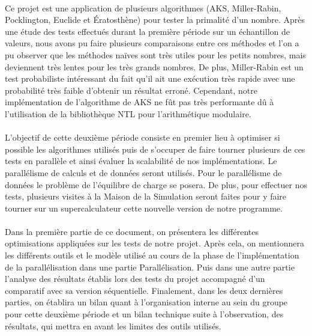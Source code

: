 	\paragraph{}Ce projet est une application de plusieurs algorithmes (AKS, Miller-Rabin, Pocklington, Euclide et Ératosthène) pour tester la primalité d'un nombre. Après une étude des tests effectués durant la première période sur un échantillon de valeurs, nous avons pu faire plusieurs comparaisons entre ces méthodes et l'on a pu observer que les méthodes naïves sont très utiles pour les petits nombres, mais deviennent très lentes pour les très grands nombres. De plus, Miller-Rabin est un test probabiliste intéressant du fait qu'il ait une exécution très rapide avec une probabilité très faible d'obtenir un résultat erroné. Cependant, notre implémentation de l'algorithme de AKS ne fût pas très performante dû à l'utilisation de la bibliothèque NTL pour l'arithmétique modulaire.
	
	\paragraph{}L'objectif de cette deuxième période consiste en premier lieu à optimiser si possible les algorithmes utilisés puis de s’occuper de faire tourner plusieurs de ces tests en parallèle et ainsi évaluer la scalabilité de nos implémentations. Le parallélisme de calculs et de données seront utilisés. Pour le parallélisme de données le problème de l'équilibre de charge se posera. De plus, pour effectuer nos tests, plusieurs visites à la Maison de la Simulation seront faites pour y faire tourner sur un supercalculateur cette nouvelle version de notre programme. 
	
	\paragraph{}Dans la première partie de ce document, on présentera les différentes optimisations appliquées sur les tests de notre projet.
	Après cela, on mentionnera les différents outils et le modèle utilisé au cours de la phase de l'implémentation de la parallélisation dans une partie Parallélisation. Puis dans une autre partie l'analyse des résultats établis lors des tests du projet accompagné d'un comparatif avec sa version séquentielle.
	Finalement, dans les deux dernières parties, on établira un bilan quant à l'organisation interne au sein du groupe pour cette deuxième période et un bilan technique suite à l'observation, des résultats, qui mettra en avant les limites des outils utilisés.
	
